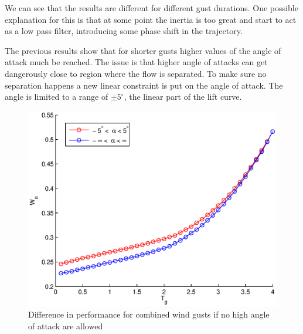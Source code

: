 \FloatBarrier

\par We can see that the results are different for different gust durations.
One possible explanation for this is that at some point the inertia is too great and start to act as a low pass filter, introducing some phase shift in the trajectory. 


The previous results show that for shorter gusts higher values of the angle of attack much be reached.
The issue is that higher angle of attacks can get dangerously close to region where the flow is separated.
To make sure no separation happens a new linear constraint is put on the angle of attack.
The angle is limited to a range of $\pm 5 ^{\circ}$, the linear part of the lift curve.


\begin{figure}[h]
  \centering
 \includegraphics{./Figures/allowed_alpha_wg_tg_wt=3.eps}
  \caption{Difference in performance for combined wind gusts if no high angle of attack are allowed}
  \label{fig:allowed_alpha_Wt_vs_tg_wt=3}
\end{figure}

